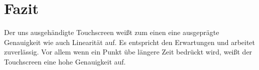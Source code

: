 \chapter{Fazit}

Der uns ausgehändigte Touchscreen weißt zum einen eine ausgeprägte Genauigkeit wie auch Linearität auf. Es entspricht den Erwartungen und arbeitet zuverlässig.
Vor allem wenn ein Punkt übe längere Zeit bedrückt wird, weißt der Touchscreen eine hohe Genauigkeit auf. 
